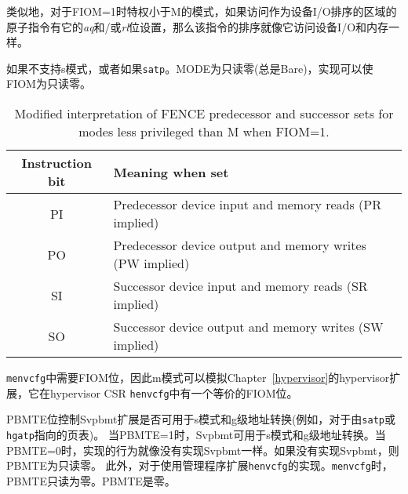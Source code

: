 {类似地，对于FIOM=1时特权小于M的模式，如果访问作为设备I/O排序的区域的原子指令有它的{\em aq}和/或{\em rl}位设置，那么该指令的排序就像它访问设备I/O和内存一样。

如果不支持s模式，或者如果{\tt satp}。MODE为只读零(总是Bare)，实现可以使FIOM为只读零。

\begin{table}[h!]
\begin{center}
\begin{tabular}{|c|l|}
\hline
Instruction bit & Meaning when set \\
\hline
PI & Predecessor device input and memory reads   (PR implied) \\
PO & Predecessor device output and memory writes (PW implied) \\
\hline
SI & Successor device input and memory reads     (SR implied) \\
SO & Successor device output and memory writes   (SW implied) \\
\hline
\end{tabular}
\end{center}
\vspace{-0.1in}
\caption{%
Modified interpretation of FENCE predecessor and successor sets
for modes less privileged than M when FIOM=1.%
}
\label{tab:menvcfg-FIOM}
\end{table}

\iffalse
\begin{commentary}
Bit FIOM is needed in {\tt menvcfg} so M-mode can emulate the
hypervisor extension of Chapter~\ref{hypervisor}, which has an
equivalent FIOM bit in the hypervisor CSR {\tt henvcfg}.
\end{commentary}
\fi
\begin{commentary}
{\tt menvcfg}中需要FIOM位，因此m模式可以模拟Chapter~\ref{hypervisor}的hypervisor扩展，它在hypervisor CSR {\tt henvcfg}中有一个等价的FIOM位。
\end{commentary}

\iffalse
The PBMTE bit controls whether the Svpbmt extension is available for use in
S-mode and G-stage address translation (i.e., for page tables pointed to by
{\tt satp} or {\tt hgatp}).
When PBMTE=1, Svpbmt is available for S-mode and G-stage address translation.
When PBMTE=0, the implementation behaves as though Svpbmt were not implemented.
If Svpbmt is not implemented, PBMTE is read-only zero.
Furthermore, for implementations with the hypervisor extension,
{\tt henvcfg}.PBMTE is read-only zero if {\tt menvcfg}.PBMTE is zero.
\fi
PBMTE位控制Svpbmt扩展是否可用于s模式和g级地址转换(例如，对于由{\tt satp}或{\tt hgatp}指向的页表)。
当PBMTE=1时，Svpbmt可用于s模式和g级地址转换。当PBMTE=0时，实现的行为就像没有实现Svpbmt一样。如果没有实现Svpbmt，则PBMTE为只读零。
此外，对于使用管理程序扩展{\tt henvcfg}的实现。{\tt menvcfg}时，PBMTE只读为零。PBMTE是零。

}
